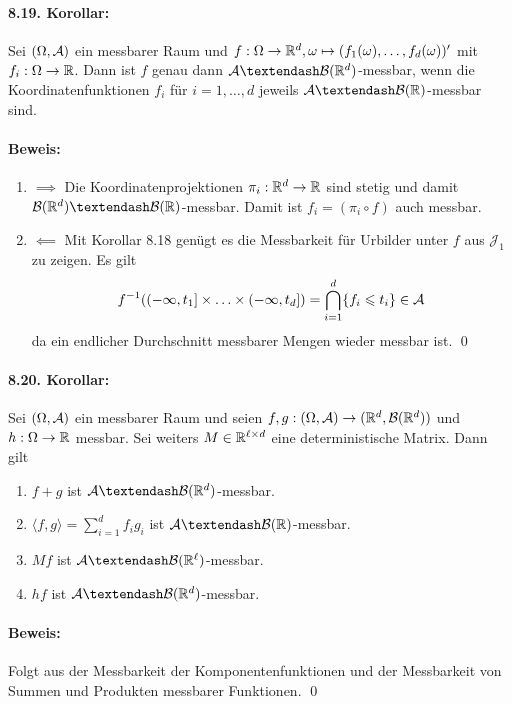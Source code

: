\documentclass[11pt]{report}
\begin{document}
\paragraph{8.19. Korollar:}Sei $(\Omega,\mathcal{A})$ ein messbarer Raum und $f:\Omega\to\mathbb{R}^d,\omega\mapsto(f_1(\omega),\hdots,f_d(\omega))'$ mit $f_i:\Omega\to\mathbb{R}$. Dann ist $f$ genau dann $\A\textendash\mathcal{B}(\R^d)$-messbar, wenn die Koordinatenfunktionen $f_i$ f\"ur $i=1,\hdots,d$ jeweils $\A\textendash\borel$-messbar sind.

\paragraph{Beweis:}
\begin{enumerate}[label=\Roman*.]
    \item $\implies$\newline
    Die Koordinatenprojektionen $\pi_i:\mathbb{R}^d\to\mathbb{R}$ sind stetig und damit $\mathcal{B}(\R^d)\textendash\borel$-messbar. Damit ist $f_i=(\pi_i\circ f)$ auch messbar.
    \item $\impliedby$\newline
    Mit Korollar 8.18 gen\"ugt es die Messbarkeit f\"ur Urbilder unter $f$ aus $\mathcal{J_1}$ zu zeigen. Es gilt
    $$f^{-1}((-\infty,t_1]\times\hdots\times(-\infty,t_d])=\bigcap_{i=1}^d\{f_i\leqslant t_i\}\in\mathcal{A}$$
    da ein endlicher Durchschnitt messbarer Mengen wieder messbar ist. \qed
\end{enumerate}

\paragraph{8.20. Korollar:}Sei $(\Omega,\mathcal{A})$ ein messbarer Raum und seien $f,g:(\Omega,\mathcal{A})\to(\mathbb{R}^d,\mathcal{B}(\mathbb{R}^d))$ und $h:\Omega\to\mathbb{R}$ messbar. Sei weiters $M\in\mathbb{R}^{\ell\times d}$ eine deterministische Matrix. Dann gilt
\begin{enumerate}[label=(\roman*)]
    \item $f+g$ ist $\A\textendash\mathcal{B}(\R^d)$-messbar.
    \item $\langle f,g\rangle=\displaystyle\sum_{i=1}^d f_i g_i$ ist $\A\textendash\borel$-messbar.
    \item $Mf$ ist $\A\textendash\mathcal{B}(\R^\ell)$-messbar.
    \item $hf$ ist $\A\textendash\mathcal{B}(\R^d)$-messbar.
\end{enumerate}

\paragraph{Beweis:}Folgt aus der Messbarkeit der Komponentenfunktionen und der Messbarkeit von Summen und Produkten messbarer Funktionen. \qed
\end{document}
